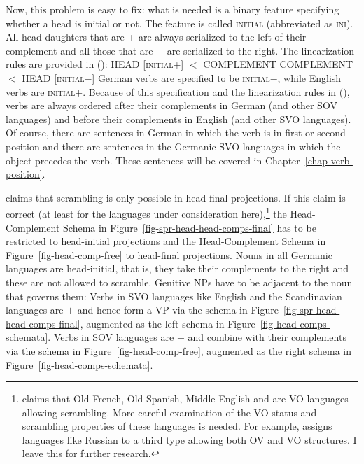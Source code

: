 Now, this problem is easy to fix: what is needed is a binary feature specifying whether a head is
initial or not. The feature is called \textsc{initial} (abbreviated as \textsc{ini}). All
head-daughters that are \ini{}+ are always serialized to the left of their complement and all those
that are \ini{}$-$ are serialized to the right. The linearization rules are provided in ():
\eal
\label{lp-regeln}
\ex HEAD [\textsc{initial}+] $<$ COMPLEMENT
\ex COMPLEMENT $<$  HEAD [\textsc{initial}$-$]
\zl
German verbs are specified to be \textsc{initial}$-$, while English verbs are
\textsc{initial}$+$. Because of this specification and the linearization rules in (), verbs
are always ordered after their complements in German (and other SOV languages) and before their
complements in English (and other SVO languages). Of course, there are sentences in German in which
the verb is in first or second position and there are sentences in the Germanic SVO languages in
which the object precedes the verb. These sentences will be covered in
Chapter~\ref{chap-verb-position}.


\citet[]{Haider2020a} claims that scrambling is only possible in
head-final projections. If this claim is correct (at least for the
languages under consideration here),\footnote{
  \citet[]{Santorini93a} claims that Old French, Old Spanish, Middle English and 
  are VO languages allowing scrambling. More careful examination of the VO status and scrambling
  properties of these languages is needed. For example, \citet[Section~3]{Haider2021a} assigns languages like Russian to a
  third type allowing both OV and VO structures. I leave this for further research.
} the Head-Complement Schema in Figure~\ref{fig-spr-head-head-comps-final} has to
be restricted to head-initial projections and the Head-Complement Schema in Figure~\ref{fig-head-comp-free} to
head-final projections. Nouns in all Germanic languages are head-initial, that is, they take their
complements to the right and these are not allowed to scramble. Genitive NPs have to be adjacent to
the noun that governs them:
\eal
{}
\zl
Verbs in SVO languages like English and the Scandinavian languages are \initial{}$+$ and hence form a
VP via the schema in Figure~\ref{fig-spr-head-head-comps-final}, augmented as the left schema in
Figure~\ref{fig-head-comps-schemata}. Verbs in SOV languages are \initial{}$-$ and combine with their
complements via the schema in Figure~\ref{fig-head-comp-free}, augmented as the right schema in
Figure~\ref{fig-head-comps-schemata}. 

